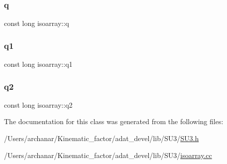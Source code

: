 \subsubsection{\texorpdfstring{q}{q}}
{\footnotesize\ttfamily const long isoarray\+::q}

\mbox{\label{classisoarray_a49a8c7ad042720ba0f0251f838a81926}} 
\subsubsection{\texorpdfstring{q1}{q1}}
{\footnotesize\ttfamily const long isoarray\+::q1}

\mbox{\label{classisoarray_a3d08dedb3a7b238fe7a088f8aa54db0b}} 
\subsubsection{\texorpdfstring{q2}{q2}}
{\footnotesize\ttfamily const long isoarray\+::q2}



The documentation for this class was generated from the following files\+:\begin{DoxyCompactItemize}
\item 
/\+Users/archanar/\+Kinematic\+\_\+factor/adat\+\_\+devel/lib/\+S\+U3/\mbox{\hyperlink{lib_2SU3_2SU3_8h}{S\+U3.\+h}}\item 
/\+Users/archanar/\+Kinematic\+\_\+factor/adat\+\_\+devel/lib/\+S\+U3/\mbox{\hyperlink{isoarray_8cc}{isoarray.\+cc}}\end{DoxyCompactItemize}
